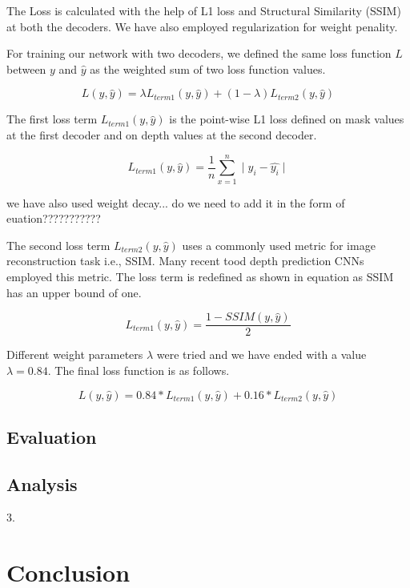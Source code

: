 \documentclass{article}
\begin{document}
The Loss is calculated with the help of L1 loss and Structural Similarity (SSIM) at both the decoders. 
We have also employed regularization for weight penality.

For training our network with two decoders, we defined the same loss function $L$ between $y$ and $\hat{y}$ as the weighted sum of 
two loss function values.

\begin{equation}
L(y, \hat{y}) = \lambda L_{term1}(y, \hat{y}) + (1 - \lambda) L_{term2}(y, \hat{y})
\end{equation}

The first loss term $L_{term1}(y, \hat{y})$ is the point-wise L1 loss defined on mask values at the first decoder and 
on depth values at the second decoder.

\begin{equation}
L_{term1}(y, \hat{y}) = \frac{1}{n} \sum_{x=1}^{n} \mid y_i - \hat{y_i} \mid
\end{equation}

we have also used weight decay... do we need to add it in the form of euation???????????

The second loss term $L_{term2}(y, \hat{y})$ uses a commonly used metric for image reconstruction task i.e., SSIM. 
Many recent tood depth prediction CNNs employed this metric. 
The loss term is redefined as shown in equation as SSIM has an upper bound of one.

\begin{equation}
L_{term1}(y, \hat{y}) = \frac{1 - SSIM(y, \hat{y})}{2}
\end{equation}

Different weight parameters $\lambda$ were tried and we have ended with a value $\lambda = 0.84$. The final loss function is as follows.

\begin{equation}
L(y, \hat{y}) = 0.84 \ast L_{term1}(y, \hat{y}) + 0.16 \ast L_{term2}(y, \hat{y})
\end{equation}

\subsection{Evaluation}
\subsection{Analysis}

3. 
\section{Conclusion}
\end{document}
